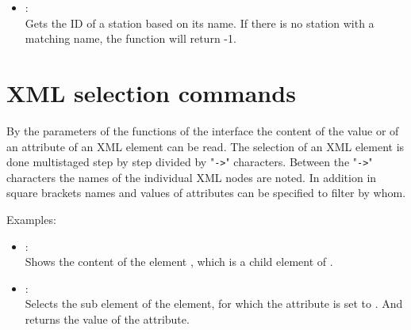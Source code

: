 \begin{itemize}

\item
{}:\\
Gets the ID of a station based on its name.
If there is no station with a matching name, the function will return -1.

\end{itemize}



\chapter{XML selection commands}

By the parameters of the functions of the  interface the content of the
value or of an attribute of an XML element can be read.
The selection of an XML element is done multistaged step by step divided by
"\texttt{->}" characters. Between the "\texttt{->}" characters the names of the individual XML nodes are
noted. In addition in square brackets names and values of attributes can be specified to filter by whom.

Examples:

\begin{itemize}

\item
{}:\\
Shows the content of the element , which is a child element of .

\item
{}:\\
Selects the  sub element of the  element, for
which the  attribute is set to . And returns the value of the
 attribute.

\end{itemize}